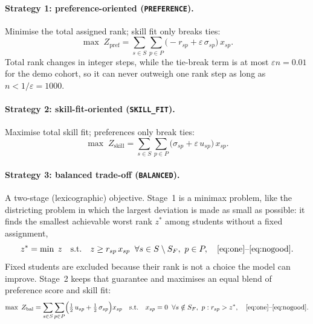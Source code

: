 \documentclass[11pt,a4paper]{article}
\newcommand{\code}[1]{\texttt{#1}}
\begin{document}
\paragraph{Strategy 1: preference-oriented (\code{PREFERENCE}).}
Minimise the total assigned rank; skill fit only breaks ties:
\begin{equation}
  \max \; Z_{\text{pref}} = \sum_{s \in S} \sum_{p \in P}
    \bigl(-r_{sp} + \varepsilon\, \sigma_{sp}\bigr)\, x_{sp}.
  \label{eq:zpref}
\end{equation}
Total rank changes in integer steps, while the tie-break term is at most
$\varepsilon n = 0.01$ for the demo cohort, so it can never outweigh one rank
step as long as $n < 1/\varepsilon = 1000$.

\paragraph{Strategy 2: skill-fit-oriented (\code{SKILL\_FIT}).}
Maximise total skill fit; preferences only break ties:
\begin{equation}
  \max \; Z_{\text{skill}} = \sum_{s \in S} \sum_{p \in P}
    \bigl(\sigma_{sp} + \varepsilon\, u_{sp}\bigr)\, x_{sp}.
  \label{eq:zskill}
\end{equation}

\paragraph{Strategy 3: balanced trade-off (\code{BALANCED}).}
A two-stage (lexicographic) objective. Stage~1 is a minimax problem, like the
districting problem in which the largest deviation is made as small as
possible: it finds the smallest achievable worst rank $z^*$ among students
without a fixed assignment,
\begin{equation}
  z^* = \min \; z \quad \text{s.t.} \quad
  z \ge r_{sp}\, x_{sp} \;\; \forall s \in S \setminus S_F,\ p \in P,
  \quad \eqref{eq:one}\text{--}\eqref{eq:nogood}.
  \label{eq:stage1}
\end{equation}
Fixed students are excluded because their rank is not a choice the model can
improve. Stage~2 keeps that guarantee and maximises an equal blend of
preference score and skill fit:
\begin{equation}
  \max \; Z_{\text{bal}} = \sum_{s \in S} \sum_{p \in P}
    \Bigl(\tfrac12\, u_{sp} + \tfrac12\, \sigma_{sp}\Bigr) x_{sp}
  \quad \text{s.t.} \quad
  x_{sp} = 0 \;\; \forall s \notin S_F,\ p : r_{sp} > z^*,
  \quad \eqref{eq:one}\text{--}\eqref{eq:nogood}.
  \label{eq:stage2}
\end{equation}
\end{document}
